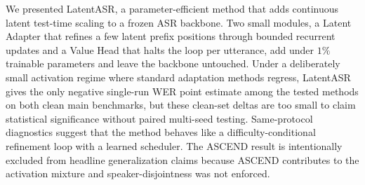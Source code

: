 \documentclass[a4paper]{article}
\newcommand{\method}{LatentASR}
\begin{document}
We presented \method{}, a parameter-efficient method that adds continuous latent test-time scaling to a frozen ASR backbone. Two small modules, a Latent Adapter that refines a few latent prefix positions through bounded recurrent updates and a Value Head that halts the loop per utterance, add under $1\%$ trainable parameters and leave the backbone untouched. Under a deliberately small activation regime where standard adaptation methods regress, \method{} gives the only negative single-run WER point estimate among the tested methods on both clean main benchmarks, but these clean-set deltas are too small to claim statistical significance without paired multi-seed testing. Same-protocol diagnostics suggest that the method behaves like a difficulty-conditional refinement loop with a learned scheduler. The ASCEND result is intentionally excluded from headline generalization claims because ASCEND contributes to the activation mixture and speaker-disjointness was not enforced.



\end{document}
